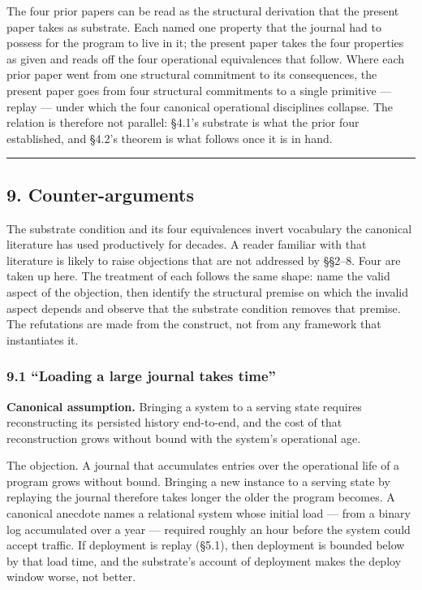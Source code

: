 \documentclass[
]{article}
\begin{document}
The four prior papers can be read as the structural derivation that the
present paper takes as substrate. Each named one property that the
journal had to possess for the program to live in it; the present paper
takes the four properties as given and reads off the four operational
equivalences that follow. Where each prior paper went from one
structural commitment to its consequences, the present paper goes from
four structural commitments to a single primitive --- replay --- under
which the four canonical operational disciplines collapse. The relation
is therefore not parallel: §4.1's substrate is what the prior four
established, and §4.2's theorem is what follows once it is in hand.

\begin{center}\rule{0.5\linewidth}{0.5pt}\end{center}

\subsection{9. Counter-arguments}\label{counter-arguments}

The substrate condition and its four equivalences invert vocabulary the
canonical literature has used productively for decades. A reader
familiar with that literature is likely to raise objections that are not
addressed by §§2--8. Four are taken up here. The treatment of each
follows the same shape: name the valid aspect of the objection, then
identify the structural premise on which the invalid aspect depends and
observe that the substrate condition removes that premise. The
refutations are made from the construct, not from any framework that
instantiates it.

\subsubsection{9.1 ``Loading a large journal takes
time''}\label{loading-a-large-journal-takes-time}

\textbf{Canonical assumption.} Bringing a system to a serving state
requires reconstructing its persisted history end-to-end, and the cost
of that reconstruction grows without bound with the system's operational
age.

The objection. A journal that accumulates entries over the operational
life of a program grows without bound. Bringing a new instance to a
serving state by replaying the journal therefore takes longer the older
the program becomes. A canonical anecdote names a relational system
whose initial load --- from a binary log accumulated over a year ---
required roughly an hour before the system could accept traffic. If
deployment is replay (§5.1), then deployment is bounded below by that
load time, and the substrate's account of deployment makes the deploy
window worse, not better.
\end{document}
